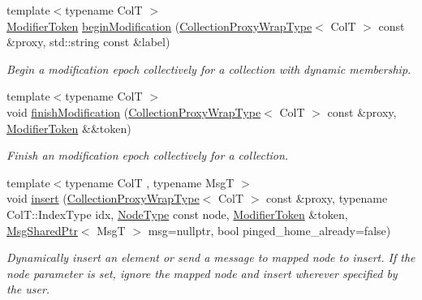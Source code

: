 \begin{DoxyCompactItemize}
{\footnotesize template$<$typename ColT $>$ }\\\hyperlink{structvt_1_1vrt_1_1collection_1_1_modifier_token}{Modifier\+Token} \hyperlink{structvt_1_1vrt_1_1collection_1_1_collection_manager_ac390149ecceb5a5b183086e509c3bfaa}{begin\+Modification} (\hyperlink{structvt_1_1vrt_1_1collection_1_1_collection_manager_a56458ed7f9bb22b631b9b3a745f42f94}{Collection\+Proxy\+Wrap\+Type}$<$ ColT $>$ const \&proxy, std\+::string const \&label)
\begin{DoxyCompactList}\small\item\em Begin a modification epoch collectively for a collection with dynamic membership. \end{DoxyCompactList}\item 
{\footnotesize template$<$typename ColT $>$ }\\void \hyperlink{structvt_1_1vrt_1_1collection_1_1_collection_manager_a249d475d576758006ba112af9907d271}{finish\+Modification} (\hyperlink{structvt_1_1vrt_1_1collection_1_1_collection_manager_a56458ed7f9bb22b631b9b3a745f42f94}{Collection\+Proxy\+Wrap\+Type}$<$ ColT $>$ const \&proxy, \hyperlink{structvt_1_1vrt_1_1collection_1_1_modifier_token}{Modifier\+Token} \&\&token)
\begin{DoxyCompactList}\small\item\em Finish an modification epoch collectively for a collection. \end{DoxyCompactList}\item 
{\footnotesize template$<$typename ColT , typename MsgT $>$ }\\void \hyperlink{structvt_1_1vrt_1_1collection_1_1_collection_manager_a57a03bda72fb30e3fc886111ff032819}{insert} (\hyperlink{structvt_1_1vrt_1_1collection_1_1_collection_manager_a56458ed7f9bb22b631b9b3a745f42f94}{Collection\+Proxy\+Wrap\+Type}$<$ ColT $>$ const \&proxy, typename Col\+T\+::\+Index\+Type idx, \hyperlink{namespacevt_a866da9d0efc19c0a1ce79e9e492f47e2}{Node\+Type} const node, \hyperlink{structvt_1_1vrt_1_1collection_1_1_modifier_token}{Modifier\+Token} \&token, \hyperlink{namespacevt_ab2b3d506ec8e8d1540aede826d84a239}{Msg\+Shared\+Ptr}$<$ MsgT $>$ msg=nullptr, bool pinged\+\_\+home\+\_\+already=false)
\begin{DoxyCompactList}\small\item\em Dynamically insert an element or send a message to mapped node to insert. If the {\ttfamily node} parameter is set, ignore the mapped node and insert wherever specified by the user. \end{DoxyCompactList}\item 

\end{DoxyCompactItemize}

